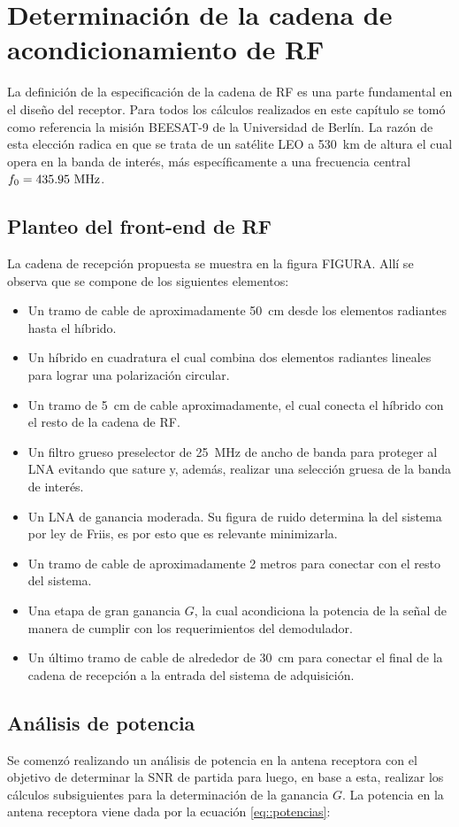 \documentclass[../../main.tex]{subfiles}
\begin{document}
\chapter{Determinación de la cadena de acondicionamiento de RF}

La definición de la especificación de la cadena de RF es una parte fundamental en el diseño del receptor. Para todos los cálculos realizados en este capítulo se tomó como referencia la misión BEESAT-9 \cite{BEESAT-9} de la Universidad de Berlín. La razón de esta elección radica en que se trata de un satélite LEO a 530~km de altura el cual opera en la banda de interés, más específicamente a una frecuencia central $f_0 = 435.95~\textrm{MHz}$.

\section{Planteo del front-end de RF}
La cadena de recepción propuesta se muestra en la figura FIGURA. Allí se observa que se compone de los siguientes elementos:
\begin{itemize}
    \item Un tramo de cable de aproximadamente 50~cm desde los elementos radiantes hasta el híbrido.
    \item Un híbrido en cuadratura el cual combina dos elementos radiantes lineales para lograr una polarización circular.
    \item Un tramo de 5~cm de cable aproximadamente, el cual conecta el híbrido con el resto de la cadena de RF.
    \item Un filtro grueso preselector de 25~MHz de ancho de banda para proteger al LNA evitando que sature y, además, realizar una selección gruesa de la banda de interés.
    \item Un LNA de ganancia moderada. Su figura de ruido determina la del sistema por ley de Friis, es por esto que es relevante minimizarla.
    \item Un tramo de cable de aproximadamente 2 metros para conectar con el resto del sistema.
    \item Una etapa de gran ganancia $G$, la cual acondiciona la potencia de la señal de manera de cumplir con los requerimientos del demodulador.
    \item Un último tramo de cable de alrededor de 30~cm para conectar el final de la cadena de recepción a la entrada del sistema de adquisición.
\end{itemize}

\section{Análisis de potencia} 
Se comenzó realizando un análisis de potencia en la antena receptora con el objetivo de determinar la SNR de partida para luego, en base a esta, realizar los cálculos subsiguientes para la determinación de la ganancia $G$. La potencia en la antena receptora viene dada por la ecuación \ref{eq::potencias}:
\end{document}
